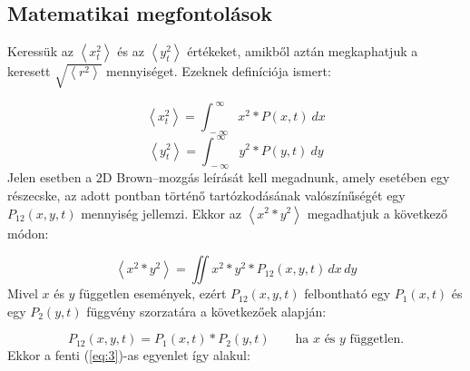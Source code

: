 \section{} \label{sec:1}

\subsection{Matematikai megfontolások}
Keressük az $\left< x_{t}^{2} \right>$ és az $\left< y_{t}^{2} \right>$ értékeket, amikből aztán megkaphatjuk a keresett $\sqrt{\left< r^{2} \right>}$ mennyiséget. Ezeknek definíciója ismert:

\begin{equation} \label{eq:1}
    \left< x_{t}^{2} \right>
    =
    \int_{\ -\infty}^{\ \infty} x^{2} * P \left( x, t \right)\ dx
\end{equation}
\begin{equation} \label{eq:2}
    \left< y_{t}^{2} \right>
    =
    \int_{\ -\infty}^{\ \infty} y^{2} * P \left( y, t \right)\ dy
\end{equation}
Jelen esetben a 2D Brown--mozgás leírását kell megadnunk, amely esetében egy részecske, az adott pontban történő tartózkodásának valószínűségét egy $P_{12} \left( x, y, t \right)$ mennyiség jellemzi. Ekkor az $\left< x^{2} * y^{2} \right>$ megadhatjuk a következő módon:

\begin{equation} \label{eq:3}
    \left< x^{2} * y^{2} \right>
    =
    \iint{x^{2} * y^{2} * P_{12} \left( x, y, t \right)\, dx\, dy}
\end{equation}
Mivel $x$ és $y$ független események, ezért $P_{12} \left( x, y, t \right)$ felbontható egy $P_{1} \left( x, t \right)$ és egy $P_{2} \left( y, t \right)$ függvény szorzatára a következőek alapján:

\begin{equation}
    P_{12} \left( x, y, t \right) = P_{1} \left( x, t \right) * P_{2} \left( y, t \right) \quad \quad \text{ha $x$ és $y$ független.}
\end{equation}
Ekkor a fenti (\ref{eq:3})-as egyenlet így alakul:

